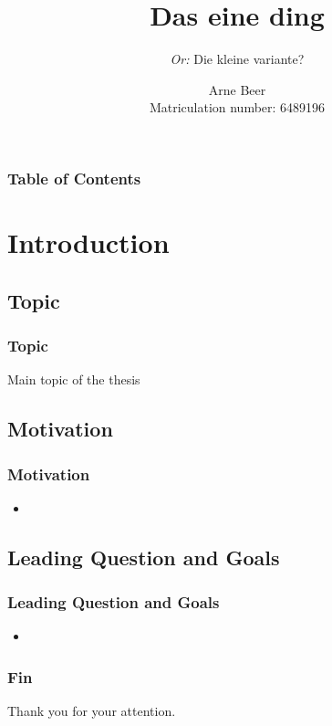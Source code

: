 \documentclass{beamer}
\title[Der Title]
{Das eine ding}
\subtitle{\textit{Or:} Die kleine variante?}
\author[Beer]{Arne Beer \\ \footnotesize Matriculation number: 6489196}
\institute[University of Hamburg]{
    Department of Computer Science\\
    University of Hamburg
}
\begin{document}
\frame{\titlepage}
\begin{frame}
    \frametitle{Table of Contents}
    \footnotesize
    \tableofcontents
\end{frame}

\section{Introduction}

\subsection{Topic}
\begin{frame}
    \frametitle{Topic}
    \begin{block}{Main topic of the thesis}
    \end{block}
\end{frame}

\subsection{Motivation}
\begin{frame}
    \frametitle{Motivation}
    \begin{itemize}
        \item
    \end{itemize}
\end{frame}

\subsection{Leading Question and Goals}
\begin{frame}
    \frametitle{Leading Question and Goals}
    \begin{itemize}
        \item
    \end{itemize}
\end{frame}

\begin{frame}
    \frametitle{Fin}
    Thank you for your attention.
\end{frame}
\end{document}
